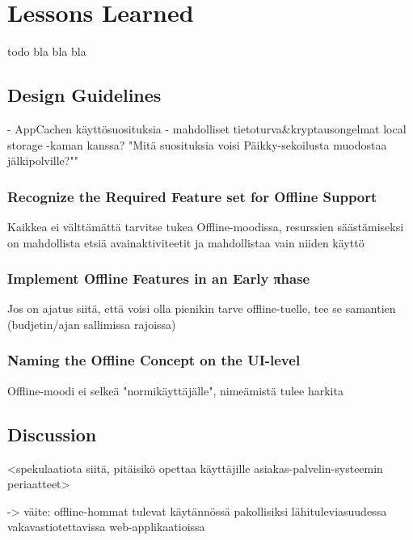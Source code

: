 \chapter{Lessons Learned}
todo bla bla bla



\section{Design Guidelines}
- AppCachen käyttösuosituksia
- mahdolliset tietoturva&kryptausongelmat local storage -kaman kanssa?
"Mitä suosituksia voisi Päikky-sekoilusta muodostaa jälkipolville?""

\subsection{Recognize the Required Feature set for Offline Support}
Kaikkea ei välttämättä tarvitse tukea Offline-moodissa, resurssien säästämiseksi on mahdollista etsiä avainaktiviteetit ja mahdollistaa vain niiden käyttö


\subsection{Implement Offline Features in an Early πhase}
Jos on ajatus siitä, että voisi olla pienikin tarve offline-tuelle, tee se samantien (budjetin/ajan sallimissa rajoissa)

\subsection{Naming the Offline Concept on the UI-level}
Offline-moodi ei selkeä "normikäyttäjälle", nimeämistä tulee harkita



\section{Discussion}

<spekulaatiota siitä, pitäisikö opettaa käyttäjille asiakas-palvelin-systeemin periaatteet>


-> väite: offline-hommat tulevat käytännössä pakollisiksi lähituleviasuudessa vakavastiotettavissa web-applikaatioissa










